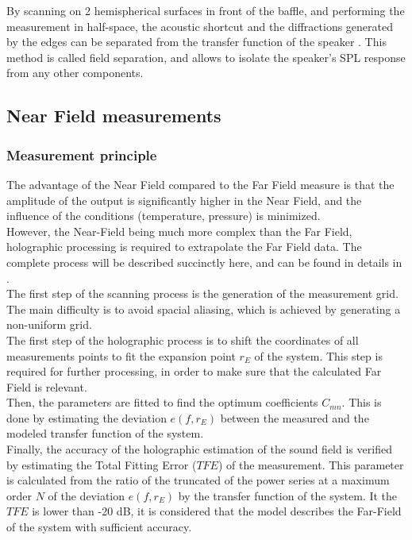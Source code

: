 \documentclass{report}
\begin{document}
By scanning on 2 hemispherical surfaces in front of the baffle, and performing the measurement in half-space, the acoustic shortcut and the diffractions generated by the edges can be separated from the transfer function of the speaker \cite{pres}. This method is called field separation, and allows to isolate the speaker's SPL response from any other components. 

\subsection{Near Field measurements}

\subsubsection{Measurement principle}

The advantage of the Near Field compared to the Far Field measure is that the amplitude of the output is significantly higher in the Near Field, and the influence of the conditions (temperature, pressure) is minimized. \\
However, the Near-Field being much more complex than the Far Field, holographic processing is required to extrapolate the Far Field data. The complete process will be described succinctly here, and can be found in details in \citep[][sect.~3]{aeshs}.\\

The first step of the scanning process is the generation of the measurement grid. The main difficulty is to avoid spacial aliasing, which is achieved by generating a non-uniform grid. \\
The first step of the holographic process is to shift the coordinates of all measurements points to fit the expansion point $r_{E}$ of the system. This step is required for further processing, in order to make sure that the calculated Far Field is relevant.\\ 

Then, the parameters are fitted to find the optimum coefficients $C_{mn}$. This is done by estimating the deviation $e(f,r_{E})$ between the measured and the modeled transfer function of the system. \\

Finally, the accuracy of the holographic estimation of the sound field is verified by estimating the Total Fitting Error ($TFE$) of the measurement. This parameter is calculated from the ratio of the truncated of the power series at a maximum order $N$ of the deviation $e(f,r_{E})$ by the transfer function of the system. It the $TFE$ is lower than -20 dB, it is considered that the model describes the Far-Field of the system with sufficient accuracy. 
\end{document}
